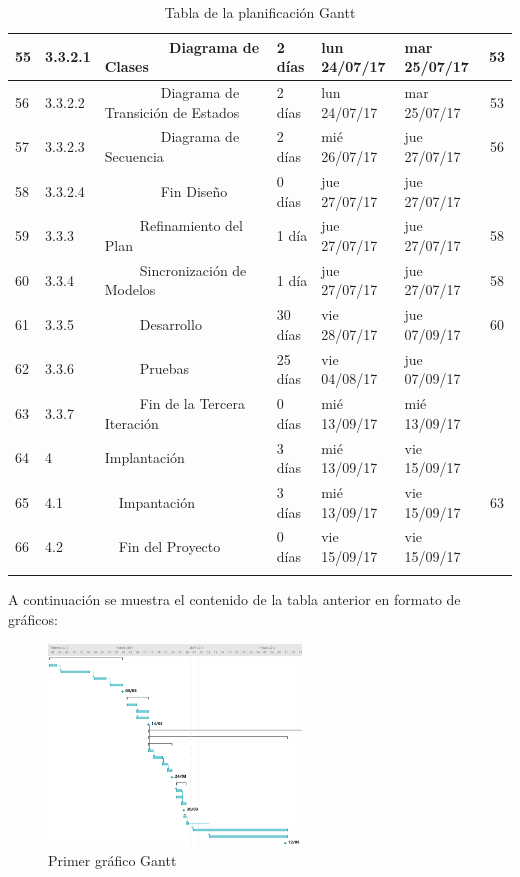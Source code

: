 \begin{center}
\begin{longtable}{  l  l  l  l  l  l  c  }
	55 & 3.3.2.1 &         Diagrama de Clases & 2 días & lun 24/07/17 & mar 25/07/17 & 53 \\ \hline
	56 & 3.3.2.2 &         Diagrama de Transición de Estados & 2 días & lun 24/07/17 & mar 25/07/17 & 53 \\ \hline
	57 & 3.3.2.3 &         Diagrama de Secuencia & 2 días & mié 26/07/17 & jue 27/07/17 & 56 \\ \hline
	58 & 3.3.2.4 &         Fin Diseño & 0 días & jue 27/07/17 & jue 27/07/17 &  \\ \hline
	59 & 3.3.3 &      Refinamiento del Plan & 1 día & jue 27/07/17 & jue 27/07/17 & 58 \\ \hline
	60 & 3.3.4 &      Sincronización de Modelos & 1 día & jue 27/07/17 & jue 27/07/17 & 58 \\ \hline
	61 & 3.3.5 &      Desarrollo & 30 días & vie 28/07/17 & jue 07/09/17 & 60 \\ \hline
	62 & 3.3.6 &      Pruebas & 25 días & vie 04/08/17 & jue 07/09/17 &  \\ \hline
	63 & 3.3.7 &      Fin de la Tercera Iteración & 0 días & mié 13/09/17 & mié 13/09/17 &  \\ \hline
	64 & 4 & Implantación & 3 días & mié 13/09/17 & vie 15/09/17 &  \\ \hline
	65 & 4.1 &   Impantación & 3 días & mié 13/09/17 & vie 15/09/17 & 63 \\ \hline
	66 & 4.2 &   Fin del Proyecto & 0 días & vie 15/09/17 & vie 15/09/17 &  \\ \hline
  \caption{Tabla de la planificación Gantt}
  \label{tab:tablagantt}
\end{longtable}
\end{center}

\par A continuación se muestra el contenido de la tabla anterior en formato de gráficos:
\begin{figure}[h]
\begin{center}
\includegraphics[width=0.6\textwidth]{./img/Gantt1.png}
\end{center}
\caption{Primer gráfico Gantt}
\label{tab:gantt1}
\end{figure}

